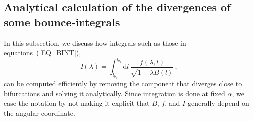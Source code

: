 
\subsection{Analytical calculation of the divergences of some bounce-integrals}\label{SEC_DIV}


In this subsection, we discuss how integrals such as those in equations~(\ref{EQ_BINT}),
\begin{equation} 
I(\lambda)=\int_{l_{b_1}}^{l_{b_2}}\mathrm{d}l\,\frac{f(\lambda,l)}{\sqrt{1-\lambda B(l)}}\,,
\end{equation}
can be computed efficiently by removing the component that diverges close to bifurcations and solving it analytically. Since integration is done at fixed $\alpha$, we ease the notation by not making it explicit that $B$, $f$, and $I$ generally depend on the angular coordinate.


